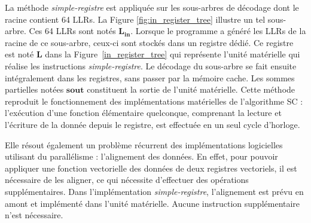 La méthode \textit{simple-registre} est appliquée sur les sous-arbres de décodage dont le \noeud racine contient 64 LLRs. La Figure \ref{fig:in_register_tree} illustre un tel sous-arbre.
Ces 64 LLRs sont notés $\mathbold{L_{in}}$.
Lorsque le programme a généré les LLRs de la racine de ce sous-arbre, ceux-ci sont stockés dans un registre dédié.
Ce registre est noté $\mathbold{L}$ dans la Figure~\ref{in_register_tree} qui représente l'unité matérielle qui réalise les instructions \textit{simple-registre}.
Le décodage du sous-arbre se fait ensuite intégralement dans les registres, sans passer par la mémoire cache.
Les sommes partielles notées $\mathbold{s{out}}$ constituent la sortie de l'unité matérielle.
Cette méthode reproduit le fonctionnement des implémentations matérielles de l'algorithme SC : l'exécution d'une fonction élémentaire quelconque, comprenant la lecture et l'écriture de la donnée depuis le registre, est effectuée en un seul cycle d'horloge.





Elle résout également un problème récurrent des implémentations logicielles utilisant du parallélisme : l'alignement des données. En effet, pour pouvoir appliquer une fonction vectorielle des données de deux registres vectoriels, il est nécessaire de les aligner, ce qui nécessite d'effectuer des opérations supplémentaires. Dans l'implémentation \textit{simple-registre}, l'alignement est prévu en amont et implémenté dans l'unité matérielle. Aucune instruction supplémentaire n'est nécessaire. 

